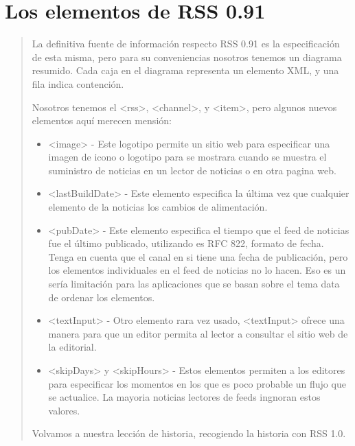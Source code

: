 \normalsize

\section{Los elementos de RSS 0.91}

\scriptsize

\blockquote{
La definitiva fuente de informaci\'{o}n respecto RSS 0.91 es la especificación de esta misma, pero 
para su conveniencias nosotros tenemos un diagrama resumido. Cada caja en el diagrama representa
un elemento XML, y una fila indica contención.

Nosotros tenemos el <rss>, <channel>, y <item>, pero algunos nuevos elementos aquí merecen mensión:

\begin{itemize}

\item <image> - Este logotipo permite un sitio web para especificar una imagen de icono o logotipo para
se mostrara cuando se muestra el suministro de noticias en un lector de noticias o en otra pagina web.

\item <lastBuildDate> - Este elemento especifica la última vez que cualquier elemento de la noticias los
cambios de alimentación.

\item <pubDate> - Este elemento especifica el tiempo que el feed de noticias fue el último publicado, utilizando
es RFC 822, formato de fecha. Tenga en cuenta que el canal en si tiene una fecha de publicación, pero los
elementos individuales en el feed de noticias no lo hacen. Eso es un sería limitación para las aplicaciones
que se basan sobre el tema data de ordenar los elementos.

\item <textInput> - Otro elemento rara vez usado, <textInput> ofrece una manera para que un editor permita al
lector a consultar el sitio web de la editorial.

\item <skipDays> y <skipHours> - Estos elementos permiten a los editores para especificar los momentos en los
que es poco probable un flujo que se actualice. La mayoria noticias lectores de feeds ingnoran estos
valores.

\end{itemize}

Volvamos a nuestra lección de historia, recogiendo la historia con RSS 1.0.\cite{johnson2006rss}

}

